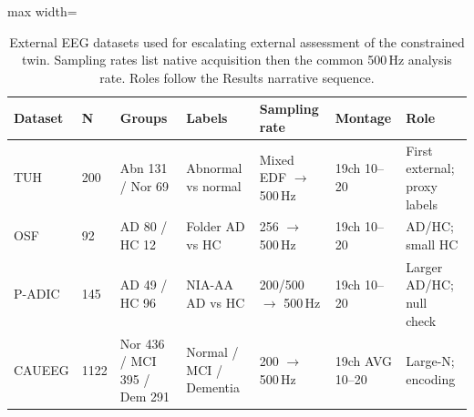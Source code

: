 \begin{table}[!t]
\centering
\footnotesize
\setlength{\tabcolsep}{3pt}
\caption{External EEG datasets used for escalating external assessment of the constrained twin.
Sampling rates list native acquisition then the common 500\,Hz analysis rate.
Roles follow the Results narrative sequence.}
\label{tab:datasets}
\begin{adjustbox}{max width=\textwidth}
\begin{tabular}{@{}llp{2.2cm}p{2.4cm}p{2.5cm}p{1.9cm}p{2.4cm}@{}}
\toprule
Dataset & N & Groups & Labels & Sampling rate & Montage & Role \\
\midrule
TUH & 200 & Abn 131 / Nor 69 & Abnormal vs normal & Mixed EDF $\rightarrow$ 500\,Hz & 19ch 10--20 & First external; proxy labels \\
OSF & 92 & AD 80 / HC 12 & Folder AD vs HC & 256 $\rightarrow$ 500\,Hz & 19ch 10--20 & AD/HC; small HC \\
P-ADIC & 145 & AD 49 / HC 96 & NIA-AA AD vs HC & 200/500 $\rightarrow$ 500\,Hz & 19ch 10--20 & Larger AD/HC; null check \\
CAUEEG & 1122 & Nor 436 / MCI 395 / Dem 291 & Normal / MCI / Dementia & 200 $\rightarrow$ 500\,Hz & 19ch AVG 10--20 & Large-N; encoding \\
\bottomrule
\end{tabular}
\end{adjustbox}
\end{table}
